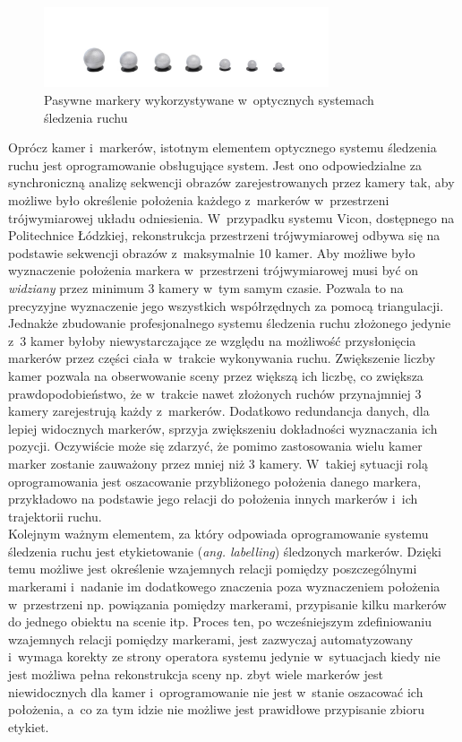 \begin{figure}[!htp]
	\centering	
	\includegraphics[width=0.75\textwidth]{images/super-spherical-markers-hero.jpg}
	\caption{Pasywne markery wykorzystywane w~optycznych systemach śledzenia ruchu\cite{QulisysMarkers}}		
	\label{fig:literature:qualisys:markers}
\end{figure}

Oprócz kamer i~markerów, istotnym elementem optycznego systemu śledzenia ruchu jest oprogramowanie obsługujące system. Jest ono odpowiedzialne za synchroniczną analizę sekwencji obrazów zarejestrowanych przez kamery tak, aby możliwe było określenie położenia każdego z~markerów w~przestrzeni trójwymiarowej układu odniesienia. W~przypadku systemu Vicon, dostępnego na Politechnice Łódzkiej, rekonstrukcja przestrzeni trójwymiarowej odbywa się na podstawie sekwencji obrazów z~maksymalnie 10 kamer. Aby możliwe było wyznaczenie położenia markera w~przestrzeni trójwymiarowej musi być on \textsl{widziany} przez minimum 3 kamery w~tym samym czasie. Pozwala to na precyzyjne wyznaczenie jego wszystkich współrzędnych za pomocą triangulacji. Jednakże zbudowanie profesjonalnego systemu śledzenia ruchu złożonego jedynie z~3 kamer byłoby niewystarczające ze względu na możliwość przysłonięcia markerów przez części ciała w~trakcie wykonywania ruchu. Zwiększenie liczby kamer pozwala na obserwowanie sceny przez większą ich liczbę, co zwiększa prawdopodobieństwo, że w~trakcie nawet złożonych ruchów przynajmniej 3 kamery zarejestrują każdy z~markerów. Dodatkowo redundancja danych, dla lepiej widocznych markerów, sprzyja zwiększeniu dokładności wyznaczania ich pozycji. Oczywiście może się zdarzyć, że pomimo zastosowania wielu kamer marker zostanie zauważony przez mniej niż 3 kamery. W~takiej sytuacji rolą oprogramowania jest oszacowanie przybliżonego położenia danego markera, przykładowo na podstawie jego relacji do położenia innych markerów i~ich trajektorii ruchu.\\

Kolejnym ważnym elementem, za który odpowiada oprogramowanie systemu śledzenia ruchu jest etykietowanie (\emph{ang. labelling}) śledzonych markerów. Dzięki temu możliwe jest określenie wzajemnych relacji pomiędzy poszczególnymi markerami i~nadanie im dodatkowego znaczenia poza wyznaczeniem położenia w~przestrzeni np. powiązania pomiędzy markerami, przypisanie kilku markerów do jednego obiektu na scenie itp. Proces ten, po wcześniejszym zdefiniowaniu wzajemnych relacji pomiędzy markerami, jest zazwyczaj automatyzowany i~wymaga korekty ze strony operatora systemu jedynie w~sytuacjach kiedy nie jest możliwa pełna rekonstrukcja sceny np. zbyt wiele markerów jest niewidocznych dla kamer i~oprogramowanie nie jest w~stanie oszacować ich położenia, a~co za tym idzie nie możliwe jest prawidłowe przypisanie zbioru etykiet.\\ 

